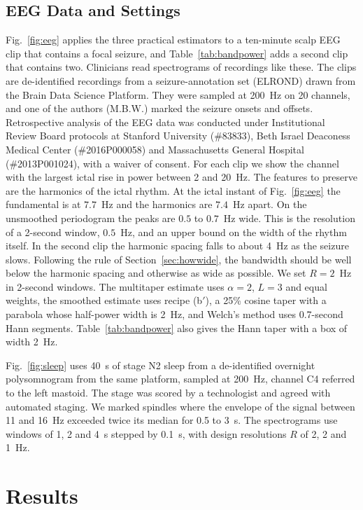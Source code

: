 \documentclass[10pt,twocolumn]{article}
\begin{document}
\subsection{EEG Data and Settings}
\label{sec:eegmethods}
Fig.~\ref{fig:eeg} applies the three practical estimators to a ten-minute scalp EEG clip that contains a focal seizure, and Table~\ref{tab:bandpower} adds a second clip that contains two. Clinicians read spectrograms of recordings like these. The clips are de-identified recordings from a seizure-annotation set (ELROND) drawn from the Brain Data Science Platform. They were sampled at 200~Hz on 20 channels, and one of the authors (M.B.W.) marked the seizure onsets and offsets. Retrospective analysis of the EEG data was conducted under Institutional Review Board protocols at Stanford University (\#83833), Beth Israel Deaconess Medical Center (\#2016P000058) and Massachusetts General Hospital (\#2013P001024), with a waiver of consent. For each clip we show the channel with the largest ictal rise in power between 2 and 20~Hz. The features to preserve are the harmonics of the ictal rhythm. At the ictal instant of Fig.~\ref{fig:eeg} the fundamental is at $7.7$~Hz and the harmonics are $7.4$~Hz apart. On the unsmoothed periodogram the peaks are $0.5$ to $0.7$~Hz wide. This is the resolution of a 2-second window, $0.5$~Hz, and an upper bound on the width of the rhythm itself. In the second clip the harmonic spacing falls to about 4~Hz as the seizure slows. Following the rule of Section~\ref{sec:howwide}, the bandwidth should be well below the harmonic spacing and otherwise as wide as possible. We set $R=2$~Hz in 2-second windows. The multitaper estimate uses $\alpha=2$, $L=3$ and equal weights, the smoothed estimate uses recipe (b$'$), a 25\% cosine taper with a parabola whose half-power width is 2~Hz, and Welch's method uses 0.7-second Hann segments. Table~\ref{tab:bandpower} also gives the Hann taper with a box of width 2~Hz.

Fig.~\ref{fig:sleep} uses 40~s of stage N2 sleep from a de-identified overnight polysomnogram from the same platform, sampled at 200~Hz, channel C4 referred to the left mastoid. The stage was scored by a technologist and agreed with automated staging. We marked spindles where the envelope of the signal between 11 and 16~Hz exceeded twice its median for 0.5 to 3~s. The spectrograms use windows of 1, 2 and 4~s stepped by 0.1~s, with design resolutions $R$ of 2, 2 and 1~Hz.


\section{Results}
\label{sec:results}
\end{document}
